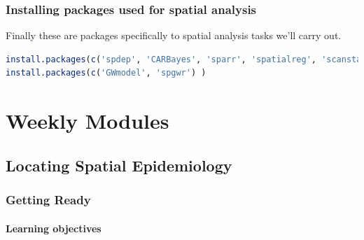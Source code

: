 \documentclass[
]{book}
\begin{document}
\hypertarget{installing-packages-used-for-spatial-analysis}{%
\section*{Installing packages used for spatial analysis}\label{installing-packages-used-for-spatial-analysis}}

Finally these are packages specifically to spatial analysis tasks we'll carry out.

\begin{lstlisting}[language=R]
install.packages(c('spdep', 'CARBayes', 'sparr', 'spatialreg', 'scanstatistics'))
install.packages(c('GWmodel', 'spgwr') )
\end{lstlisting}

\hypertarget{part-weekly-modules}{%
\part{Weekly Modules}\label{part-weekly-modules}}

\hypertarget{locating-spatial-epidemiology}{%
\chapter{Locating Spatial Epidemiology}\label{locating-spatial-epidemiology}}

\hypertarget{getting-ready}{%
\section{Getting Ready}\label{getting-ready}}

\hypertarget{learning-objectives}{%
\subsection{Learning objectives}\label{learning-objectives}}

 
  \providecommand{\huxb}[2]{\arrayrulecolor[RGB]{#1}\global\arrayrulewidth=#2pt}
  \providecommand{\huxvb}[2]{\color[RGB]{#1}\vrule width #2pt}
  \providecommand{\huxtpad}[1]{\rule{0pt}{#1}}
  \providecommand{\huxbpad}[1]{\rule[-#1]{0pt}{#1}}
\end{document}
